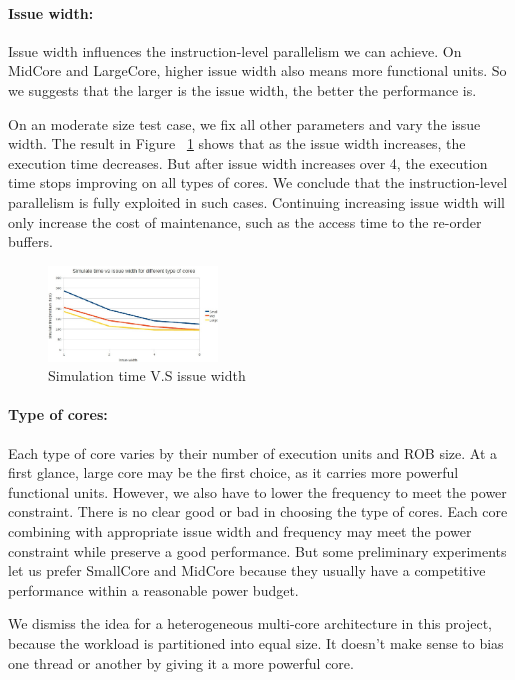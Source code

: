 \documentclass[twocolumn,letterpaper,10pt]{article}
\begin{document}
\paragraph{Issue width:} Issue width influences the instruction-level
parallelism we can achieve. On MidCore and LargeCore, higher issue width also means
more functional units. So we suggests that the larger is the issue width,
the better the performance is.

On an moderate size test case, we fix all other parameters and vary the issue
width. The result in Figure ~\ref{fig:issue} shows that as the issue width
increases, the execution time decreases. But after issue width
increases over 4, the execution time stops improving on all types of cores. We conclude that the
instruction-level parallelism is fully exploited in such cases. Continuing
increasing issue width will only increase the cost of maintenance, such as the access time to the re-order buffers.

\begin{figure}[ht!]
\begin{center}
\includegraphics[width=0.4\textwidth]{figures/issue.jpg}
\end{center}
\label{fig:issue}
\caption{Simulation time V.S issue width}
\end{figure}

\paragraph{Type of cores:} Each type of core varies by their number of
execution units and ROB size. At a first glance, large core may be the
first choice, as it carries more powerful functional units. However,
we also have to lower the frequency to meet the power
constraint. There is no clear good or bad in choosing the type of
cores. Each core combining with appropriate issue width and frequency
may meet the power constraint while preserve a good performance. But some
preliminary experiments let us prefer SmallCore and MidCore because
they usually have a competitive performance within a reasonable power budget. 

We dismiss the idea for a heterogeneous multi-core architecture in
this project, because the workload is partitioned into equal size. It
doesn't make sense to bias one thread or another by giving it a more
powerful core.
\end{document}
